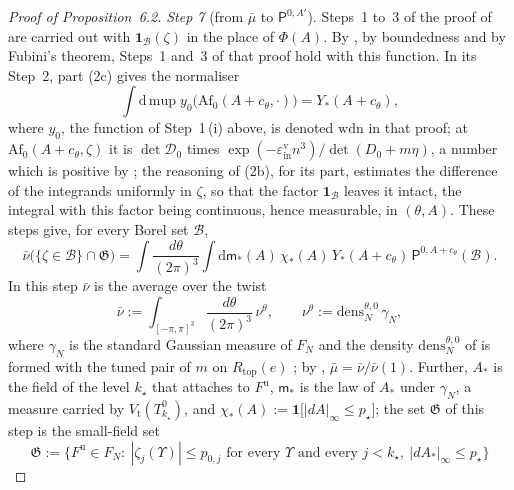 \documentclass[11pt,letterpaper,reqno]{amsart}
\theoremstyle{definition}
\begin{document}
\begin{proof}[Proof of Proposition~6.2]
\emph{Step 7} (from $\bar\mu$ to $\mathsf P^{0,A'}$).
Steps~1 to~3 of the proof of \cite[Proposition~29\,(c)]{QEDIII} are carried out with $\mathbf 1_{\mathcal B}(\zeta)$ in the place of $\Phi(A)$.
By \cite[Chapter~29, Lemma~2\,(t6)--(t8)]{QEDIII}, by boundedness and by Fubini's theorem, Steps~1 and~3 of that proof hold with this function.
In its Step~2, part (2c) gives the normaliser
\begin{equation*}
\int\mathrm d\,\mathrm{mup}\;y_0\bigl(\mathrm{Af}_0(A+c_\theta,\cdot)\bigr)=Y_*(A+c_\theta),
\end{equation*}
where $y_0$, the function of Step~1\,(i) above, is denoted $\mathrm{wdn}$ in that proof;
at $\mathrm{Af}_0(A+c_\theta,\zeta)$ it is $\det\mathcal D_0$ times $\exp(-\varepsilon^{\mathrm v}_{\mathrm{in}}n^3)/\det(D_0+m\eta)$, a number which is positive by \cite[Proposition~31.1\,(a)]{QEDIII};
the reasoning of (2b), for its part, estimates the difference of the integrands uniformly in $\zeta$, so that the factor $\mathbf 1_{\mathcal B}$ leaves it intact, the integral with this factor being continuous, hence measurable, in $(\theta,A)$.
These steps give, for every Borel set $\mathcal B$,
\begin{equation*}
\bar\nu\bigl(\{\zeta\in\mathcal B\}\cap\mathfrak G\bigr)=\int\frac{d\theta}{(2\pi)^3}\int\mathrm d\mathsf m_*(A)\,\chi_*(A)\,Y_*(A+c_\theta)\,\mathsf P^{0,A+c_\theta}(\mathcal B).
\end{equation*}
In this step $\bar\nu$ is the average over the twist
\begin{equation*}
\bar\nu:=\int_{[-\pi,\pi]^3}\frac{d\theta}{(2\pi)^3}\,\nu^\theta,\qquad\nu^\theta:=\mathrm{dens}^{\theta,0}_N\,\gamma_N,
\end{equation*}
where $\gamma_N$ is the standard Gaussian measure of $F_N$ and the density $\mathrm{dens}^{\theta,0}_N$ of \cite[(I.7.2)]{QEDIII} is formed with the tuned pair of $m$ on $R_{\mathrm{top}}(e)$ \cite[Section~I.7.3]{QEDIII};
by \cite[Proposition~31.1\,(c)]{QEDIII}, $\bar\mu=\bar\nu/\bar\nu(1)$.
Further, $A_*$ is the field of the level $k_\star$ that \cite[Definition~5.11]{QEDI} attaches to $F^{\mathrm u}$, $\mathsf m_*$ is the law of $A_*$ under $\gamma_N$, a measure carried by $V_{\mathrm t}(T^0_{k_\star})$, and $\chi_*(A):=\mathbf 1\bigl[|dA|_\infty\le p_\star\bigr]$;
the set $\mathfrak G$ of this step is the small-field set
\begin{equation*}
\mathfrak G:=\bigl\{F^{\mathrm u}\in F_N:\ |\zeta_j(\Upsilon)|\le p_{0,j}\text{ for every }\Upsilon\text{ and every }j<k_\star,\ |dA_*|_\infty\le p_\star\bigr\}

\end{equation*}
\end{proof}
\end{document}
